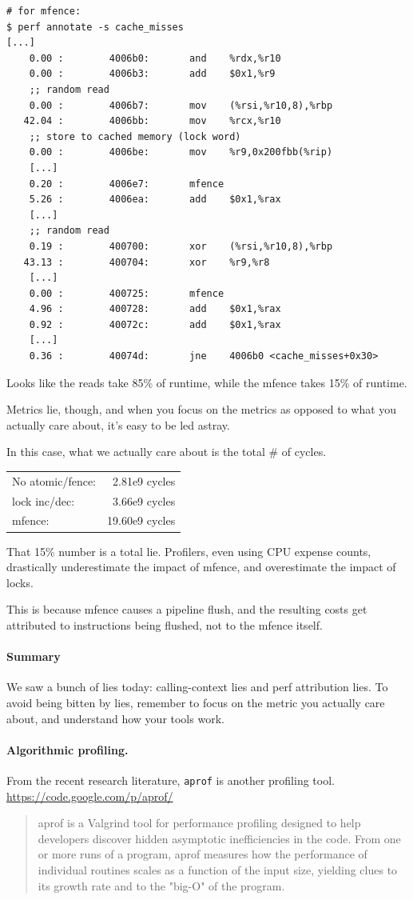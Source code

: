 {\scriptsize
\begin{lstlisting}
# for mfence:
$ perf annotate -s cache_misses
[...]
    0.00 :        4006b0:       and    %rdx,%r10
    0.00 :        4006b3:       add    $0x1,%r9
    ;; random read
    0.00 :        4006b7:       mov    (%rsi,%r10,8),%rbp
   42.04 :        4006bb:       mov    %rcx,%r10
    ;; store to cached memory (lock word)
    0.00 :        4006be:       mov    %r9,0x200fbb(%rip)
    [...]
    0.20 :        4006e7:       mfence 
    5.26 :        4006ea:       add    $0x1,%rax
    [...]
    ;; random read
    0.19 :        400700:       xor    (%rsi,%r10,8),%rbp
   43.13 :        400704:       xor    %r9,%r8
    [...]
    0.00 :        400725:       mfence 
    4.96 :        400728:       add    $0x1,%rax
    0.92 :        40072c:       add    $0x1,%rax
    [...]
    0.36 :        40074d:       jne    4006b0 <cache_misses+0x30>
\end{lstlisting}
}
Looks like the reads take 85\% of runtime,
while the mfence takes 15\% of runtime.

Metrics lie, though, and when you focus on the metrics as opposed to what you
actually care about, it's easy to be led astray.

In this case, what we actually care about is the total \# of cycles.

    \begin{tabular}{lr}
    No atomic/fence:& 2.81e9 cycles\\
    lock inc/dec: & 3.66e9 cycles\\
    mfence: & 19.60e9 cycles
    \end{tabular}

That 15\% number is a total lie.
Profilers, even using CPU expense counts, drastically underestimate the impact of mfence,
and overestimate the impact of locks.

This is because mfence causes a pipeline flush, and the resulting 
costs get attributed to instructions being flushed, not to the mfence itself.

\paragraph{Summary} We saw a bunch of lies today: calling-context lies and perf attribution
lies. To avoid being bitten by lies, remember to focus on the metric you actually care about,
and understand how your tools work.

  \paragraph{Algorithmic profiling.} From the recent research literature,
  {\tt aprof} is another profiling tool.
  \url{https://code.google.com/p/aprof/}
{\scriptsize
  \begin{quote}
  aprof is a Valgrind tool for performance profiling designed to help developers discover hidden asymptotic inefficiencies in the code. From one or more runs of a program, aprof measures how the performance of individual routines scales as a function of the input size, yielding clues to its growth rate and to the "big-O" of the program.
  \end{quote}
  }



